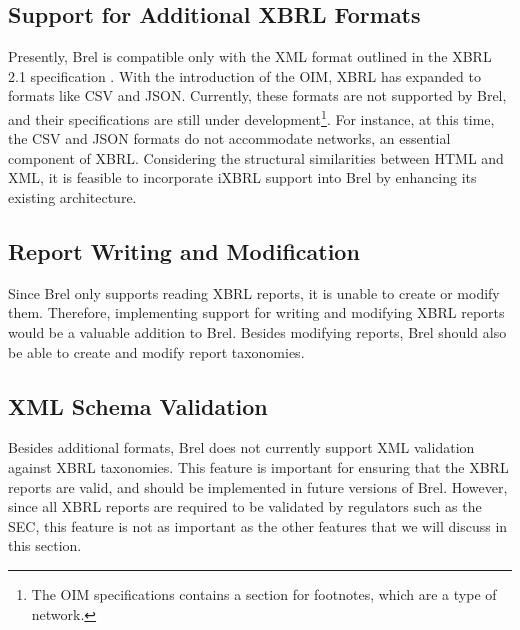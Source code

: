 \subsection{Support for Additional XBRL Formats}

Presently, Brel is compatible only with the XML format outlined in the XBRL 2.1 specification \cite{xbrl21}.
With the introduction of the OIM, XBRL has expanded to 
\textcolor{turkishrose}{formats like CSV and JSON}.
Currently, these formats are not supported by Brel, and their specifications are still under development\footnote{The OIM specifications contains a section for footnotes, which are a type of network.}.
For instance, at this time, the CSV and JSON formats do not accommodate networks, an essential component of XBRL.
Considering the structural similarities between HTML and XML, it is feasible to incorporate iXBRL support into Brel by enhancing its existing architecture.

\subsection{Report Writing and Modification}

Since Brel only supports reading XBRL reports, it is unable to create or modify them.
Therefore, implementing support for 
\textcolor{turkishrose}{writing and modifying XBRL reports} would be a valuable addition to Brel.
Besides modifying reports, Brel should also be able to create and modify report taxonomies.

\subsection{XML Schema Validation}

Besides additional formats, Brel does not currently support 
\textcolor{turkishrose}{XML validation against XBRL taxonomies}.
This feature is important for ensuring that the XBRL reports are valid, and should be implemented in future versions of Brel.
However, since all XBRL reports are required to be validated by regulators such as the SEC, this feature is not as important as the other features that we will discuss in this section.

